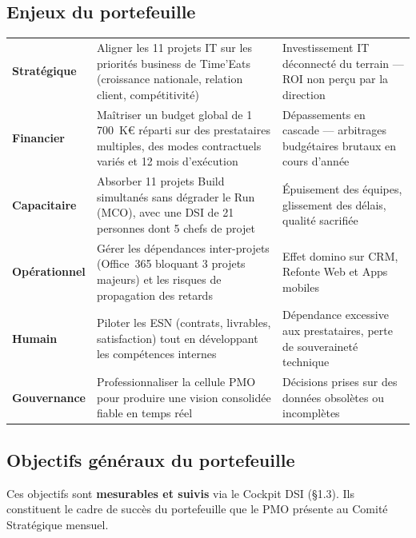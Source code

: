 \documentclass[11pt,a4paper,oneside]{report}
\begin{document}
\subsection{Enjeux du portefeuille}

\vspace{4pt}
\begin{center}
\renewcommand{\arraystretch}{1.6}
\begin{tabularx}{\textwidth}{C{2.5cm} L{5.5cm} L{6cm}}
\toprule
{}
 &  &  \\
\midrule
\textbf{Stratégique} & Aligner les 11 projets IT sur les priorités business de Time'Eats (croissance nationale, relation client, compétitivité) & Investissement IT déconnecté du terrain — ROI non perçu par la direction \\
\textbf{Financier} & Maîtriser un budget global de 1\,700~K€ réparti sur des prestataires multiples, des modes contractuels variés et 12 mois d'exécution & Dépassements en cascade — arbitrages budgétaires brutaux en cours d'année \\
\textbf{Capacitaire} & Absorber 11 projets Build simultanés sans dégrader le Run (MCO), avec une DSI de 21 personnes dont 5 chefs de projet & Épuisement des équipes, glissement des délais, qualité sacrifiée \\
\textbf{Opérationnel} & Gérer les dépendances inter-projets (Office~365 bloquant 3 projets majeurs) et les risques de propagation des retards & Effet domino sur CRM, Refonte Web et Apps mobiles \\
\textbf{Humain} & Piloter les ESN (contrats, livrables, satisfaction) tout en développant les compétences internes & Dépendance excessive aux prestataires, perte de souveraineté technique \\
\textbf{Gouvernance} & Professionnaliser la cellule PMO pour produire une vision consolidée fiable en temps réel & Décisions prises sur des données obsolètes ou incomplètes \\
\bottomrule
\end{tabularx}
\end{center}

\subsection{Objectifs généraux du portefeuille}

Ces objectifs sont \textbf{mesurables et suivis} via le Cockpit DSI (§1.3). Ils constituent le cadre de succès du portefeuille que le PMO présente au Comité Stratégique mensuel.
\end{document}
